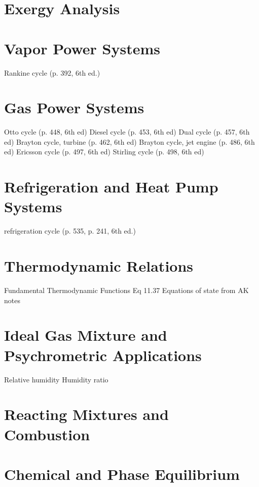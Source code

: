 \documentclass[paper=letter, fontsize=11pt]{scrartcl}
\numberwithin{equation}{section}        %
\numberwithin{figure}{section}          %
\numberwithin{table}{section}               %
\begin{document}
\newpage
\section{Exergy Analysis}

\section{Vapor Power Systems}
    Rankine cycle (p. 392, 6th ed.)

\section{Gas Power Systems}
    Otto cycle (p. 448, 6th ed)
    Diesel cycle (p. 453, 6th ed)
    Dual cycle (p. 457, 6th ed)
    Brayton cycle, turbine (p. 462, 6th ed)
    Brayton cycle, jet engine (p. 486, 6th ed)
    Ericsson cycle (p. 497, 6th ed)
    Stirling cycle (p. 498, 6th ed)

\section{Refrigeration and Heat Pump Systems}
    refrigeration cycle (p. 535, p. 241, 6th ed.)

\section{Thermodynamic Relations}
    Fundamental Thermodynamic Functions Eq 11.37
    Equations of state from AK notes

\section{Ideal Gas Mixture and Psychrometric Applications}
    Relative humidity
    Humidity ratio

\section{Reacting Mixtures and Combustion}

\section{Chemical and Phase Equilibrium}

\end{document}
